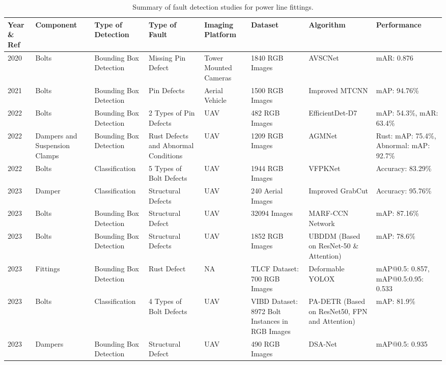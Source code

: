 \begin{table*}[htb]
\scriptsize
\caption{Summary of fault detection studies for power line fittings.}
\label{tab:fittings_faults}
\begin{tabular}{P{.05} P{.1} P{.1} P{.1} P{.1} P{.15} P{.1} P{.1}}    

\hline  
Year \& Ref & Component & Type of Detection & Type of Fault & Imaging Platform & Dataset & Algorithm & Performance \\ 
\hline 

2020 \cite{zhao_detection_2020} & Bolts & Bounding Box Detection & Missing Pin Defect & Tower Mounted Cameras & 1840 RGB Images & AVSCNet & mAR: 0.876 \\

2021 \cite{xiao_detection_2021} & Bolts & Bounding Box Detection & Pin Defects & Aerial Vehicle & 1500 RGB Images & Improved MTCNN & mAP: 94.76\% \\

2022 \cite{li_pin_2022} & Bolts & Bounding Box Detection & 2 Types of Pin Defects & UAV & 482 RGB Images & EfficientDet-D7 & mAP: 54.3\%, mAR: 63.4\% \\

2022 \cite{zhang_attention_guided_2022} & Dampers and Suspension Clamps & Bounding Box Detection & Rust Defects and Abnormal Conditions & UAV & 1209 RGB Images & AGMNet & Rust: mAP: 75.4\%, Abnormal: mAP: 92.7\% \\

2022 \cite{zhao_new_2022} & Bolts & Classification & 5 Types of Bolt Defects & UAV & 1944 RGB Images & VFPKNet & Accuracy: 83.29\% \\

2023 \cite{huang_structural_2023} & Damper & Classification & Structural Defects & UAV & 240 Aerial Images & Improved GrabCut & Accuracy: 95.76\% \\

2023 \cite{jiao2023defective} & Bolts & Bounding Box Detection & Structural Defect & UAV & 32094 Images & MARF-CCN Network & mAP: 87.16\% \\

2023 \cite{luo_ultrasmall_2023} & Bolts & Bounding Box Detection & Structural Defects & UAV & 1852 RGB Images & UBDDM (Based on ResNet-50 \& Attention) & mAP: 78.6\% \\

2023 \cite{song_deformable_2023} & Fittings & Bounding Box Detection & Rust Defect & NA & TLCF Dataset: 700 RGB Images & Deformable YOLOX & mAP@0.5: 0.857, mAP@0.5:0.95: 0.533 \\

2023 \cite{zhang_pa_detr_2023} & Bolts & Classification & 4 Types of Bolt Defects & UAV & VIBD Dataset: 8972 Bolt Instances in RGB Images & PA-DETR (Based on ResNet50, FPN and Attention) & mAP: 81.9\% \\

2023 \cite{zhang2023dsa} & Dampers & Bounding Box Detection & Structural Defect & UAV & 490 RGB Images & DSA-Net & mAP@0.5: 0.935 \\
\hline

\end{tabular}
\end{table*}

